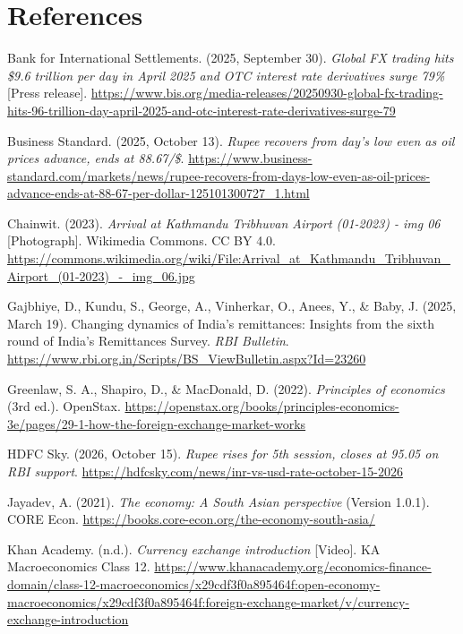 \section*{References}
\begingroup\small\setlength{\parindent}{-1.5em}\setlength{\leftskip}{1.5em}\RaggedRight
Bank for International Settlements. (2025, September 30). \emph{Global FX trading hits \$9.6 trillion per day in April 2025 and OTC interest rate derivatives surge 79\%} [Press release]. \url{https://www.bis.org/media-releases/20250930-global-fx-trading-hits-96-trillion-day-april-2025-and-otc-interest-rate-derivatives-surge-79}\par\smallskip
Business Standard. (2025, October 13). \emph{Rupee recovers from day’s low even as oil prices advance, ends at 88.67/\$}. \url{https://www.business-standard.com/markets/news/rupee-recovers-from-days-low-even-as-oil-prices-advance-ends-at-88-67-per-dollar-125101300727_1.html}\par\smallskip
Chainwit. (2023). \emph{Arrival at Kathmandu Tribhuvan Airport (01-2023) - img 06} [Photograph]. Wikimedia Commons. CC BY 4.0. \url{https://commons.wikimedia.org/wiki/File:Arrival_at_Kathmandu_Tribhuvan_Airport_(01-2023)_-_img_06.jpg}\par\smallskip
Gajbhiye, D., Kundu, S., George, A., Vinherkar, O., Anees, Y., \& Baby, J. (2025, March 19). Changing dynamics of India’s remittances: Insights from the sixth round of India’s Remittances Survey. \emph{RBI Bulletin}. \url{https://www.rbi.org.in/Scripts/BS_ViewBulletin.aspx?Id=23260}\par\smallskip
Greenlaw, S. A., Shapiro, D., \& MacDonald, D. (2022). \emph{Principles of economics} (3rd ed.). OpenStax. \url{https://openstax.org/books/principles-economics-3e/pages/29-1-how-the-foreign-exchange-market-works}\par\smallskip
HDFC Sky. (2026, October 15). \emph{Rupee rises for 5th session, closes at 95.05 on RBI support}. \url{https://hdfcsky.com/news/inr-vs-usd-rate-october-15-2026}\par\smallskip
Jayadev, A. (2021). \emph{The economy: A South Asian perspective} (Version 1.0.1). CORE Econ. \url{https://books.core-econ.org/the-economy-south-asia/}\par\smallskip
Khan Academy. (n.d.). \emph{Currency exchange introduction} [Video]. KA Macroeconomics Class 12. \url{https://www.khanacademy.org/economics-finance-domain/class-12-macroeconomics/x29cdf3f0a895464f:open-economy-macroeconomics/x29cdf3f0a895464f:foreign-exchange-market/v/currency-exchange-introduction}\par\smallskip
